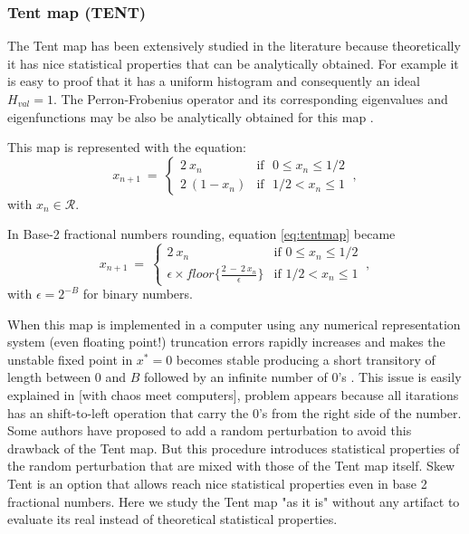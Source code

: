 \subsubsection{Tent map (TENT)} \label{sssec:tent}

The Tent map has been extensively studied in the literature because theoretically it has nice  statistical properties that can be analytically obtained. For example it is easy to proof that it has a uniform histogram and consequently an ideal $H_{val}=1$. The Perron-Frobenius operator and its corresponding eigenvalues and eigenfunctions may be also be analytically obtained for this map \cite{tent}. 

This map is represented with the equation:
\begin{equation}\label{eq:tentmap}
x_{n+1}~=~ \left\{ \begin{array}{ll}
2~{x_n} & \textrm{if ~$0\leq x_n\leq 1/2$}\\
2~(1-{x_n}) & \textrm{if ~$1/2<x_n\leq 1$} 
\end{array} \right.  \ ,
\end{equation}
with $x_n\in\mathcal{R}$.

In Base-2 fractional numbers rounding, equation \ref{eq:tentmap} became
\begin{equation}\label{eq:tentdecbin}
x_{n+1}~=~ \left\{ \begin{array}{ll}
2~{x_n} & \textrm{if $0\leq x_n\leq 1/2$}\\
\epsilon \times floor\{\frac{2~-~2~x_n}{\epsilon}\} & \textrm{if $1/2<x_n\leq 1$} 
\end{array} \right.  \ ,
\end{equation}
with $\epsilon=2^{-B}$ for binary numbers.

When this map is implemented in a computer using any numerical representation system (even floating point!) truncation errors rapidly increases and makes the unstable fixed point in $x^*=0$ becomes stable producing a short transitory of length between $0$ and $B$ followed by an infinite number of  $0$'s \cite{Jessa1993,Callegari1997}.
This issue is easily explained in [with chaos meet computers], problem appears because all itarations has an shift-to-left operation that carry the $0$'s from the right side of the number.
Some authors \cite{buscar} have proposed to add a random perturbation to avoid this drawback of the Tent map. But this procedure introduces statistical properties of the random perturbation that are mixed with those of the Tent map itself.
Skew Tent is an option that allows reach nice statistical properties even in base 2 fractional numbers.
Here we study the Tent map "as it is" without any artifact to evaluate its real instead of theoretical statistical properties. 

